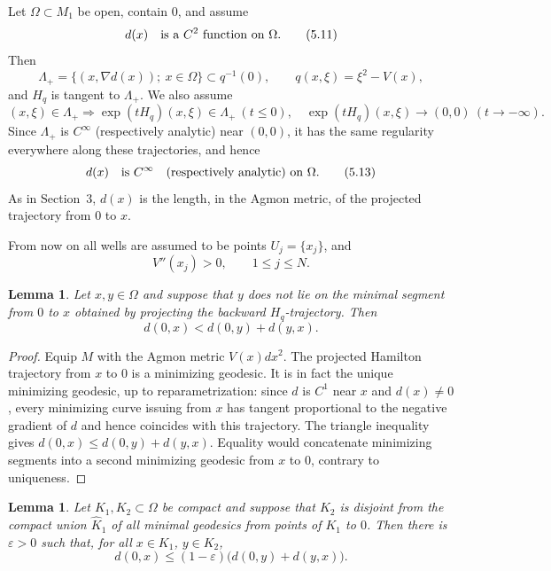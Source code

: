 \documentclass[11pt,a4paper]{article}
\newcommand{\eps}{\varepsilon}
\numberwithin{equation}{section}
\newtheorem{lemma}[theorem]{Lemma}
\theoremstyle{remark}
\begin{document}
Let $\Omega\subset M_1$ be open, contain $0$, and assume
\begin{equation}
d(x)\quad\hbox{is a }C^2\hbox{ function on }\Omega.
\tag{5.11}
\end{equation}
Then
\[
\Lambda_+=\{(x,\nabla d(x));\ x\in\Omega\}\subset q^{-1}(0),
\qquad q(x,\xi)=\xi^2-V(x),
\]
and $H_q$ is tangent to $\Lambda_+$. We also assume
\begin{equation}
(x,\xi)\in\Lambda_+\Longrightarrow
\exp(tH_q)(x,\xi)\in\Lambda_+\ (t\le0),
\quad
\exp(tH_q)(x,\xi)\to(0,0)\ (t\to-\infty).
\tag{5.12}
\end{equation}
Since $\Lambda_+$ is $C^\infty$ (respectively analytic) near $(0,0)$, it has the same regularity everywhere along these trajectories, and hence
\begin{equation}
d(x)\quad\hbox{is }C^\infty\quad\hbox{(respectively analytic) on }\Omega.
\tag{5.13}
\end{equation}
As in Section~3, $d(x)$ is the length, in the Agmon metric, of the projected trajectory from $0$ to $x$.

From now on all wells are assumed to be points $U_j=\{x_j\}$, and
\begin{equation}
V''(x_j)>0,
\qquad 1\le j\le N.
\tag{5.14}
\end{equation}

\begin{lemma}
Let $x,y\in\Omega$ and suppose that $y$ does not lie on the minimal segment from $0$ to $x$ obtained by projecting the backward $H_q$-trajectory. Then
\[
d(0,x)<d(0,y)+d(y,x).
\]
\end{lemma}
\begin{proof}
Equip $M$ with the Agmon metric $V(x)dx^2$. The projected Hamilton trajectory from $x$ to $0$ is a minimizing geodesic. It is in fact the unique minimizing geodesic, up to reparametrization: since $d$ is $C^1$ near $x$ and $d(x)\ne0$, every minimizing curve issuing from $x$ has tangent proportional to the negative gradient of $d$ and hence coincides with this trajectory. The triangle inequality gives $d(0,x)\le d(0,y)+d(y,x)$. Equality would concatenate minimizing segments into a second minimizing geodesic from $x$ to $0$, contrary to uniqueness.
\end{proof}

\begin{lemma}
Let $K_1,K_2\subset\Omega$ be compact and suppose that $K_2$ is disjoint from the compact union $\widehat K_1$ of all minimal geodesics from points of $K_1$ to $0$. Then there is $\eps>0$ such that, for all $x\in K_1$, $y\in K_2$,
\begin{equation}
d(0,x)\le(1-\eps)\bigl(d(0,y)+d(y,x)\bigr).
\tag{5.15}
\end{equation}
\end{lemma}
\end{document}
